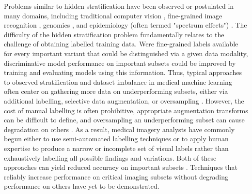 \documentclass{article}
\begin{document}
Problems similar to hidden stratification have been observed or postulated in many domains, including traditional computer vision \citep{recht2018cifar}, fine-grained image recognition \citep{yao2011combining}, genomics \citep{cardon2003population}, and epidemiology (often termed "spectrum effects") \citep{mulherin2002spectrum}.
The difficulty of the hidden stratification problem fundamentally relates to the challenge of obtaining labelled training data.  
Were fine-grained labels available for every important variant that could be distinguished via a given data modality, discriminative model performance on important subsets could be improved by training and evaluating models using this information.  
Thus, typical approaches to observed stratification and dataset imbalance in medical machine learning often center on gathering more data on underperforming subsets, either via additional labelling, selective data augmentation, or oversampling \citep{Mazurowski2008-cq}.  
However, the cost of manual labelling is often prohibitive, appropriate augmentation transforms can be difficult to define, and oversampling an underperforming subset can cause degradation on others \citep{Fries2019-ze, Ratner2017-td, Buda2018-ab, Zech2018-xq}.  
As a result, medical imagery analysts have commonly begun either to use semi-automated labelling techniques \citep{Wang2017-vm, Fries2019-ze, Irvin2019-ho, Dunnmon2019-zw, Fries2019-ze} or to apply human expertise to produce a narrow or incomplete set of visual labels \citep{Rajpurkar2017-rc} rather than exhaustively labelling all possible findings and variations.
Both of these approaches can yield reduced accuracy on important subsets \citep{Oakden-Rayner2019-yi}.  
Techniques that reliably increase performance on critical imaging subsets without degrading performance on others have yet to be demonstrated.
 
\end{document}
